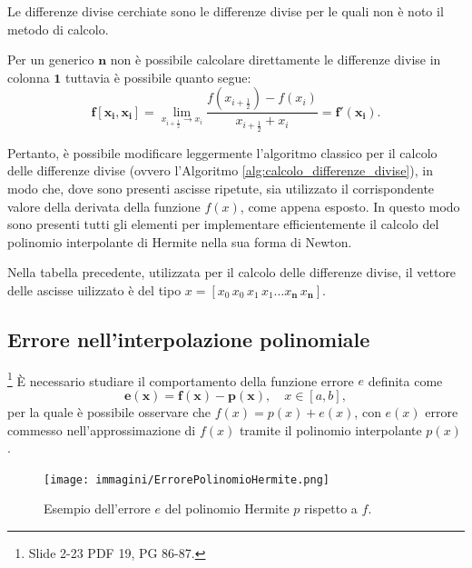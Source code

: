 \begin{example}
    Le differenze divise cerchiate sono le differenze divise per le quali non è noto il metodo di calcolo. 
    
    Per un generico $\boldsymbol n$ non è possibile calcolare direttamente le differenze divise in colonna $\boldsymbol{1}$  tuttavia è possibile quanto segue:
    \begin{equation*}
        \boldsymbol{f[x_i,x_i]}=\lim_{x_{i+\frac{1}{2}}\to x_i}\frac{f\left(x_{i+\frac{1}{2}}\right)-f(x_i)}{x_{i+\frac{1}{2}}+x_i}=\boldsymbol{f'(x_i)}.
    \end{equation*}
\end{example}

Pertanto, è possibile modificare leggermente l'algoritmo classico per il calcolo delle differenze divise (ovvero l'Algoritmo \ref{alg:calcolo_differenze_divise}), in modo che, dove sono presenti ascisse ripetute, sia utilizzato il corrispondente valore della derivata della funzione $f(x)$, come appena esposto. In questo modo sono presenti tutti gli elementi per implementare efficientemente il calcolo del polinomio interpolante di Hermite nella sua forma di Newton.

\begin{remark}
    Nella tabella precedente, utilizzata per il calcolo delle differenze divise, il vettore delle ascisse uilizzato è del tipo $x=[x_0\, x_0\, x_1\, x_1 \hdots x_{\boldsymbol n}\, x_{\boldsymbol n}].$
\end{remark}

\subsection{Errore nell'interpolazione polinomiale}\label{ssec:errore_interpolazione_polinomiale}\footnote{Slide 2-23 PDF 19, PG 86-87.}
È necessario studiare il comportamento della funzione errore $e$ definita come
\begin{equation}\label{eq:defErrInter}
    \boldsymbol{e(x)=f(x)-p(x)},\quad x\in [a,b],
\end{equation}
per la quale è possibile osservare che $f(x)=p(x)+e(x)$, con $e(x)$ errore commesso nell'approssimazione di $f(x)$ tramite il polinomio interpolante $p(x)$.

\begin{figure}
    \centering
    \texttt{[image: immagini/ErrorePolinomioHermite.png]}
    \caption{Esempio dell'errore $e$ del polinomio Hermite $p$ rispetto a $f$.}
    \label{fig:errPolHer}
\end{figure}
 
